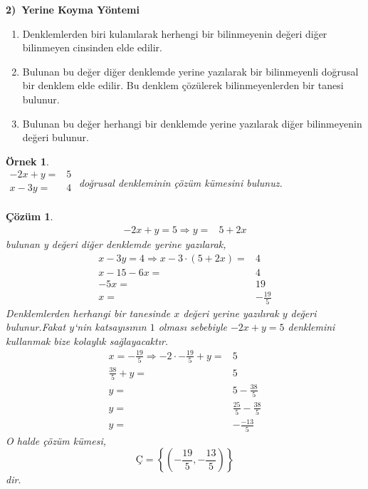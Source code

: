\documentclass[a4paper,10pt]{book}
\theoremstyle{italik}
\newtheorem{ornek}{Örnek}[chapter]
\newtheorem*{cozum}{Çözüm}
\begin{document}
\textbf{2)\ Yerine Koyma Yöntemi}
\begin{enumerate}
	\item
		Denklemlerden biri kulanılarak herhengi bir bilinmeyenin değeri diğer bilinmeyen cinsinden elde
		edilir.
	\item
		Bulunan bu değer diğer denklemde yerine yazılarak bir bilinmeyenli doğrusal bir denklem elde edilir.
		Bu denklem çözülerek bilinmeyenlerden bir tanesi bulunur.
	\item
		Bulunan bu değer herhangi bir denklemde yerine yazılarak diğer bilinmeyenin değeri bulunur.
\end{enumerate}

\begin{ornek}
	\quad \\
	$
	\begin{aligned}
		-2x+y= & 5 \\
		x-3y=  & 4 \\
	\end{aligned}
	$
	doğrusal denkleminin çözüm kümesini bulunuz.
\end{ornek}

\begin{cozum}
	$$
	\begin{aligned}
		-2x+y=5 \Rightarrow y = & 5+2x
	\end{aligned}
	$$
	bulunan y değeri diğer denklemde yerine yazılarak,
	$$
	\begin{aligned}
		x-3y=4 \Rightarrow x-3\cdot \left(5+2x\right)= & 4  \\
						      x-15-6x= & 4  \\
						          -5x= & 19 \\
							    x= & -\frac{19}{5}
        \end{aligned}
	$$
	Denklemlerden herhangi bir tanesinde $x$ değeri yerine yazılırak $y$ değeri bulunur.Fakat $y$`nin 
	katsayısının $1$ olması sebebiyle $-2x+y=5$ denklemini kullanmak bize kolaylık sağlayacaktır.
	$$
	\begin{aligned}
		x=-\frac{19}{5} \Rightarrow -2\cdot -\frac{19}{5}+y= & 5 \\
						     \frac{38}{5}+y= & 5 \\
						                  y= & 5 - \frac{38}{5} \\
								  y= & \frac{25}{5} - \frac{38}{5} \\
								  y= & -\frac{-13}{5}
	\end{aligned}
	$$
	O halde çözüm kümesi,
	$$
	\text{Ç}=\left\{(-\frac{19}{5},-\frac{13}{5})\right\}
	$$
	dir.
\end{cozum}
       
\end{document}
